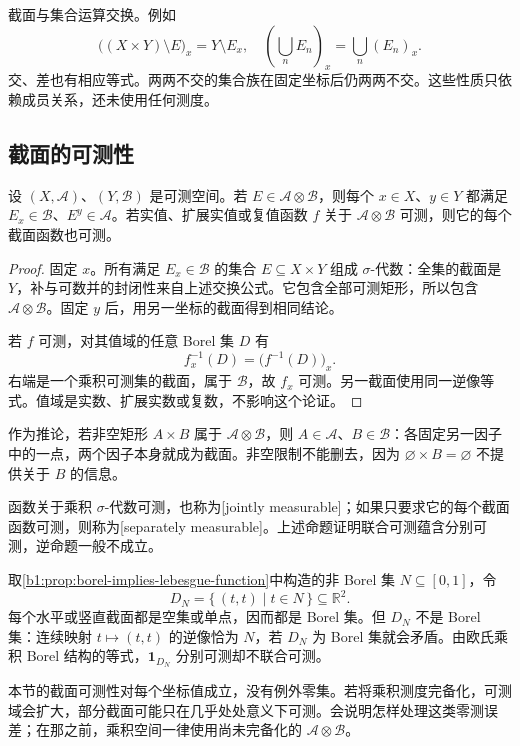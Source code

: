 \ProseParagraphBreak

截面与集合运算交换。例如
\[
\bigl((X\times Y)\setminus E\bigr)_x=Y\setminus E_x,
\quad
\left(\bigcup_nE_n\right)_x=\bigcup_n(E_n)_x.
\]
交、差也有相应等式。两两不交的集合族在固定坐标后仍两两不交。这些性质只依赖成员关系，还未使用任何测度。

\subsection{截面的可测性}
\label{b1:subsec:070104}

\begin{proposition}\label{b1:prop:product-sections-measurable}
设 \((X,\mathcal A)\)、\((Y,\mathcal B)\) 是可测空间。若 \(E\in\mathcal A\otimes\mathcal B\)，则每个 \(x\in X\)、\(y\in Y\) 都满足 \(E_x\in\mathcal B\)、\(E^y\in\mathcal A\)。若实值、扩展实值或复值函数 \(f\) 关于 \(\mathcal A\otimes\mathcal B\) 可测，则它的每个截面函数也可测。
\end{proposition}
\begin{proof}
固定 \(x\)。所有满足 \(E_x\in\mathcal B\) 的集合 \(E\subseteq X\times Y\) 组成 \(\sigma\)-代数：全集的截面是 \(Y\)，补与可数并的封闭性来自上述交换公式。它包含全部可测矩形，所以包含 \(\mathcal A\otimes\mathcal B\)。固定 \(y\) 后，用另一坐标的截面得到相同结论。

若 \(f\) 可测，对其值域的任意 Borel 集 \(D\) 有
\[
f_x^{-1}(D)=\bigl(f^{-1}(D)\bigr)_x.
\]
右端是一个乘积可测集的截面，属于 \(\mathcal B\)，故 \(f_x\) 可测。另一截面使用同一逆像等式。值域是实数、扩展实数或复数，不影响这个论证。
\end{proof}

作为推论，若非空矩形 \(A\times B\) 属于 \(\mathcal A\otimes\mathcal B\)，则 \(A\in\mathcal A\)、\(B\in\mathcal B\)：各固定另一因子中的一点，两个因子本身就成为截面。非空限制不能删去，因为 \(\varnothing\times B=\varnothing\) 不提供关于 \(B\) 的信息。

\ProseParagraphBreak

函数关于乘积 \(\sigma\)-代数可测，也称为[jointly measurable]；如果只要求它的每个截面函数可测，则称为[separately measurable]。上述命题证明联合可测蕴含分别可测，逆命题一般不成立。

\ProseParagraphBreak

取\cref{b1:prop:borel-implies-lebesgue-function}中构造的非 Borel 集 \(N\subseteq[0,1]\)，令
\[
D_N=\{\,(t,t)\mid t\in N\,\}\subseteq\mathbb R^2.
\]
每个水平或竖直截面都是空集或单点，因而都是 Borel 集。但 \(D_N\) 不是 Borel 集：连续映射 \(t\mapsto(t,t)\) 的逆像恰为 \(N\)，若 \(D_N\) 为 Borel 集就会矛盾。由欧氏乘积 Borel 结构的等式，\(\mathbf1_{D_N}\) 分别可测却不联合可测。

\ProseParagraphBreak

本节的截面可测性对每个坐标值成立，没有例外零集。若将乘积测度完备化，可测域会扩大，部分截面可能只在几乎处处意义下可测。会说明怎样处理这类零测误差；在那之前，乘积空间一律使用尚未完备化的 \(\mathcal A\otimes\mathcal B\)。
